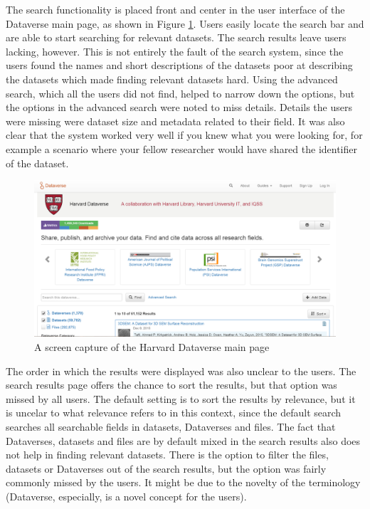 The search functionality is placed front and center in the user interface of
the Dataverse main page, as shown in Figure \ref{fig:search_main_page}. Users
easily locate the search bar and are able to start searching for relevant
datasets. The search results leave users lacking, however. This is not entirely
the fault of the search system, since the users found the names and short
descriptions of the datasets poor at describing the datasets which made
finding relevant datasets hard. Using the advanced search, which all the users
did not find, helped to narrow down the options, but the options in the
advanced search were noted to miss details. Details the users were missing
were dataset size and metadata related to their field. It was also clear that
the system worked very well if you knew what you were looking for, for example
a scenario where your fellow researcher would have shared the identifier of
the dataset.

\begin{figure}
    \begin{centering}
        \includegraphics[width=\textwidth]{images/search_main_page}
    \end{centering}
    \caption{A screen capture of the Harvard Dataverse main page}
    \label{fig:search_main_page}
\end{figure}

The order in which the results were displayed was also unclear to the users.
The search results page offers the chance to sort the results, but that option
was missed by all users. The default setting is to sort the results by
relevance, but it is uncelar to what relevance refers to in this context, since
the default search searches all searchable fields in datasets, Dataverses and files.
The fact that Dataverses, datasets and files are by default mixed in the search
results also does not help in finding relevant datasets. There is the option to
filter the files, datasets or Dataverses out of the search results, but the
option was fairly commonly missed by the users. It might be due to the novelty
of the terminology (Dataverse, especially, is a novel concept for the users).

